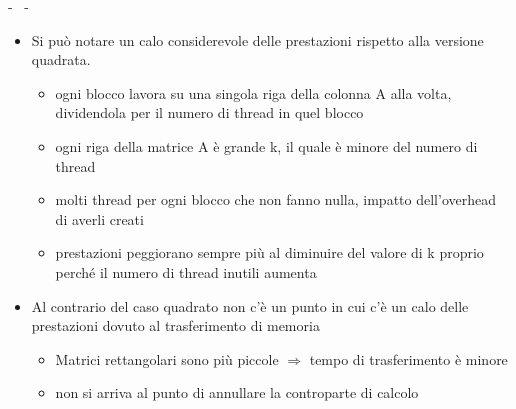 \documentclass[compress]{beamer}
\begin{document}
\begin{frame}{\secname \text{ }- \subsecname\ \text{ }- \subsubsecname}
    \begin{itemize}
    \item Si può notare un calo considerevole delle prestazioni rispetto alla versione quadrata.
        \begin{itemize}
            \item ogni blocco lavora su una singola riga della colonna A alla volta, dividendola per il numero di thread in quel blocco
            \item ogni riga della matrice A è grande k, il quale è minore del numero di thread
            \item molti thread per ogni blocco che non fanno nulla, impatto dell'overhead di averli creati
            \item prestazioni peggiorano sempre più al diminuire del valore di k proprio perché il numero di thread inutili aumenta
        \end{itemize}

    \item Al contrario del caso quadrato non c'è un punto in cui c'è un calo delle prestazioni dovuto al trasferimento di memoria
        \begin{itemize}
            \item Matrici rettangolari sono più piccole $\Rightarrow$ tempo di trasferimento è minore 
            \item non si arriva al punto di annullare la controparte di calcolo
        \end{itemize}
    \end{itemize} 
\end{frame}
\end{document}
